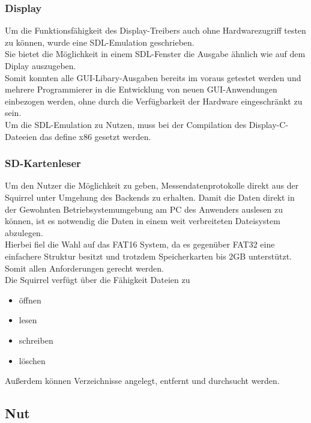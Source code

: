 \documentclass[12pt,a4paper]{article}
\begin{document}
\subsubsection{Display}
Um die Funktionsfähigkeit des Display-Treibers auch ohne Hardwarezugriff testen zu können, wurde eine SDL-Emulation geschrieben.\\
Sie bietet die Möglichkeit in einem SDL-Fenster die Ausgabe ähnlich wie auf dem Diplay auszugeben.\\
Somit konnten alle GUI-Libary-Ausgaben bereits im voraus getestet werden und mehrere Programmierer in die Entwicklung von neuen GUI-Anwendungen einbezogen werden, ohne durch die Verfügbarkeit der Hardware eingeschränkt zu sein.\\
Um die SDL-Emulation zu Nutzen, muss bei der Compilation des Display-C-Dateeien das define x86 gesetzt werden.\\

\subsubsection{SD-Kartenleser}
Um den Nutzer die Möglichkeit zu geben, Messendatenprotokolle direkt aus der Squirrel unter Umgehung des Backends zu erhalten.
Damit die Daten direkt in der Gewohnten Betriebsystemumgebung am PC des Anwenders auslesen zu können, ist es notwendig die Daten in einem weit verbreiteten Dateisystem abzulegen.\\
Hierbei fiel die Wahl auf das FAT16 System, da es gegenüber FAT32 eine einfachere Struktur besitzt und trotzdem Speicherkarten bis 2GB unterstützt. Somit allen Anforderungen gerecht werden.\\
Die Squirrel verfügt über die Fähigkeit Dateien zu
\begin{itemize}
\item öffnen
\item lesen
\item schreiben
\item löschen
\end{itemize}
Außerdem können Verzeichnisse angelegt, entfernt und durchsucht werden.\\



\subsubsection{}
\subsection{Nut}
\end{document}
